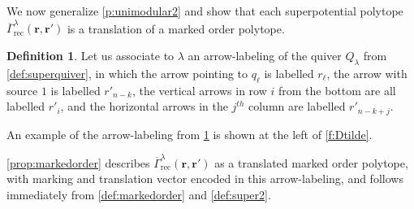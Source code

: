\documentclass{amsart}
\theoremstyle{definition}
\newtheorem{definition}[thm]{Definition}
\numberwithin{equation}{section}
\newcommand{\rr}{\mathbf r}
\newcommand{\rect}{\mathrm{rec}}
\newcommand{\rGamma}{\overline{\Gamma}}
\begin{document}
We now generalize \cref{p:unimodular2}  and show that each superpotential polytope
$\rGamma_{\rect}^{\lambda}(\rr,\rr')$
 is a translation of a marked order polytope. 

\begin{definition}\label{def:al}
Let us associate to $\lambda$ an arrow-labeling of the quiver $Q_\lambda$ from \cref{def:superquiver}, in which the arrow pointing to $q_\ell$ is labelled $r_\ell$, the arrow with source $1$ is labelled $r'_{n-k}$, the vertical arrows in row $i$ from the bottom are all labelled $r'_i$, and the horizontal arrows in the  $j^{th}$ column are labelled $r'_{n-k+j}$. 
\end{definition}
 An example of the arrow-labeling from \cref{def:al} is shown at the left of 
\cref{f:Dtilde}.

\cref{prop:markedorder}  describes $\rGamma_{\rect}^{\lambda}(\rr,\rr')$ as a 
translated marked order polytope, with marking and translation vector encoded in this 
arrow-labeling, and follows immediately from 
	 \cref{def:markedorder} and 
	\cref{def:super2}.
\end{document}
